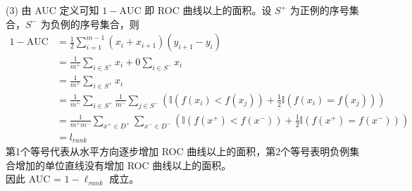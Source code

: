 \documentclass{article}
\begin{document}
	(3) 由 AUC 定义可知 $1 - \mathrm{AUC}$ 即 ROC 曲线以上的面积。设 $S^{+}$ 为正例的序号集合，$S^{-}$ 为负例的序号集合，则\\
			\begin{equation}
			\begin{aligned}
			1 - \mathrm{AUC} 
			&= \frac{1}{2} \sum_{i=1}^{m-1} \left( x_i + x_{i+1} \right) \left( y_{i+1} - y_i \right) \\
			&= \frac{1}{m^{+}} \sum_{i \in S^{+}} x_{i} + 0 \sum_{i \in S^{-}} x_{i} \\
			&= \frac{1}{m^{+}} \sum_{i \in S^{+}} x_{i} \\
			&= \frac{1}{m^{+}} \sum_{i \in S^{+}} \frac{1}{m^{-}} \sum_{j \in S^{-}} (\mathbb{I}(f(x_i)<f(x_j)) + \frac{1}{2}\mathbb{I}(f(x_i)=f(x_j))) \\
			&= \frac{1}{m^{+}m^{-}} \sum_{x^{+}\in D^{+}} \sum_{x^{-}\in D^{-}} (\mathbb{I}(f(x^{+})<f(x^{-})) + \frac{1}{2}\mathbb{I}(f(x^{+})=f(x^{-}))) \\
			&= l_{rank}
			\end{aligned}
			\end{equation}
			第1个等号代表从水平方向逐步增加 ROC 曲线以上的面积，第2个等号表明负例集合增加的单位直线没有增加 ROC 曲线以上的面积。 \\
			因此 AUC = $1 - \ell_{rank}$ 成立。
			
\end{document}
